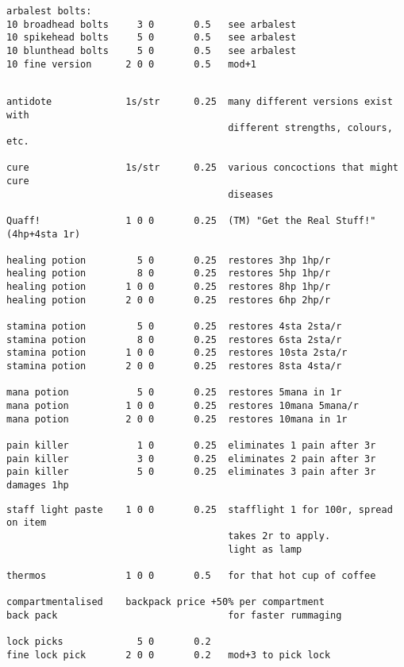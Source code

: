 \begin{verbatim}
arbalest bolts:
10 broadhead bolts     3 0       0.5   see arbalest
10 spikehead bolts     5 0       0.5   see arbalest
10 blunthead bolts     5 0       0.5   see arbalest
10 fine version      2 0 0       0.5   mod+1


\end{verbatim} \goodbreak \begin{verbatim}
antidote             1s/str      0.25  many different versions exist with
                                       different strengths, colours, etc.

cure                 1s/str      0.25  various concoctions that might cure
                                       diseases

Quaff!               1 0 0       0.25  (TM) "Get the Real Stuff!"  (4hp+4sta 1r)

healing potion         5 0       0.25  restores 3hp 1hp/r
healing potion         8 0       0.25  restores 5hp 1hp/r
healing potion       1 0 0       0.25  restores 8hp 1hp/r
healing potion       2 0 0       0.25  restores 6hp 2hp/r

stamina potion         5 0       0.25  restores 4sta 2sta/r
stamina potion         8 0       0.25  restores 6sta 2sta/r
stamina potion       1 0 0       0.25  restores 10sta 2sta/r
stamina potion       2 0 0       0.25  restores 8sta 4sta/r

mana potion            5 0       0.25  restores 5mana in 1r
mana potion          1 0 0       0.25  restores 10mana 5mana/r
mana potion          2 0 0       0.25  restores 10mana in 1r

pain killer            1 0       0.25  eliminates 1 pain after 3r
pain killer            3 0       0.25  eliminates 2 pain after 3r
pain killer            5 0       0.25  eliminates 3 pain after 3r damages 1hp

\end{verbatim} \goodbreak \begin{verbatim}
staff light paste    1 0 0       0.25  stafflight 1 for 100r, spread on item
                                       takes 2r to apply.
                                       light as lamp

thermos              1 0 0       0.5   for that hot cup of coffee

compartmentalised    backpack price +50% per compartment
back pack                              for faster rummaging

lock picks             5 0       0.2
fine lock pick       2 0 0       0.2   mod+3 to pick lock


\end{verbatim}
